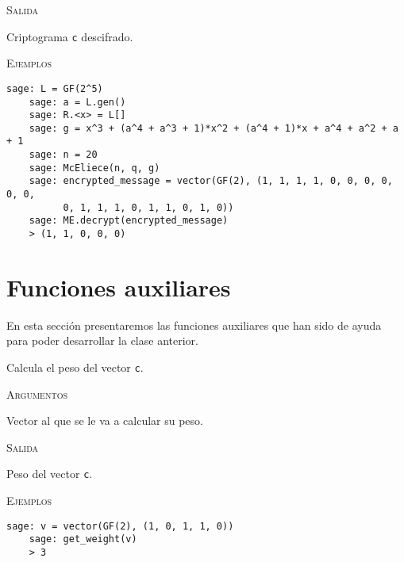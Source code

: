 \begin{description}[leftmargin=1em, font=\normalfont\ttfamily, style=nextline]
\begin{description}[font=\ttfamily, style=nextline]
  \textsc{Salida}
  \begin{description}[font=\normalfont\ttfamily]
    \item[] Criptograma \texttt{c} descifrado.
  \end{description}

  \textsc{Ejemplos}
  \begin{lstlisting}[gobble=4]
    sage: L = GF(2^5)
    sage: a = L.gen()
    sage: R.<x> = L[]
    sage: g = x^3 + (a^4 + a^3 + 1)*x^2 + (a^4 + 1)*x + a^4 + a^2 + a + 1
    sage: n = 20
    sage: McEliece(n, q, g)
    sage: encrypted_message = vector(GF(2), (1, 1, 1, 1, 0, 0, 0, 0, 0, 0, 
          0, 1, 1, 1, 0, 1, 1, 0, 1, 0))
    sage: ME.decrypt(encrypted_message)
    > (1, 1, 0, 0, 0)
  \end{lstlisting}
  \end{description}
\end{description}

\section{Funciones auxiliares}

En esta sección presentaremos las funciones auxiliares que han sido de ayuda para poder desarrollar la clase anterior.

\begin{description}[leftmargin=1em, font=\normalfont\ttfamily, style=nextline]
  \item[get\_weight(c)] Calcula el peso del vector \texttt{c}.

  \textsc{Argumentos}
  \begin{description}[font=\normalfont\ttfamily]
    \item[c] Vector al que se le va a calcular su peso.
  \end{description}

  \textsc{Salida}
  \begin{description}[font=\normalfont\ttfamily]
    \item[] Peso del vector \texttt{c}.
  \end{description}

  \textsc{Ejemplos}
  \begin{lstlisting}[gobble=4]
    sage: v = vector(GF(2), (1, 0, 1, 1, 0))
    sage: get_weight(v)
    > 3
  \end{lstlisting}
\end{description}